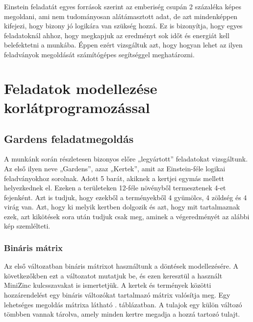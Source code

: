 \documentclass[12pt,a4paper]{report}
\begin{document}
    Einstein feladatát egyes források szerint az emberiség csupán 2 százaléka képes megoldani, ami nem tudományosan alátámasztott adat, de azt mindenképpen kifejezi, hogy bizony jó logikára van szükség hozzá.
    Ez is bizonyítja, hogy egyes feladatoknál ahhoz, hogy megkapjuk az eredményt sok időt és energiát kell belefektetni a munkába.
    Éppen ezért vizsgáltuk azt, hogy hogyan lehet az ilyen feladványok megoldását számítógépes segítséggel meghatározni.


\chapter{Feladatok modellezése korlátprogramozással}

\section{Gardens feladatmegoldás} 

    A munkánk során részletesen bizonyos előre „legyártott” feladatokat vizsgáltunk.
    Az első ilyen neve „Gardens”, azaz „Kertek”, amit az Einstein-féle logikai feladványokhoz sorolnak\cite{gardens}.
    Adott 5 barát, akiknek a kertjei egymás mellett helyezkednek el.
    Ezeken a területeken 12-féle növényből termesztenek 4-et fejenként.
    Azt is tudjuk, hogy ezekből a terményekből 4 gyümölcs, 4 zöldség és 4 virág van.
    Azt, hogy ki melyik kertben dolgozik és azt, hogy mit tartalmaznak ezek, azt kikötések sora után tudjuk csak meg, aminek a végeredményét az alábbi kép szemlélteti.


\subsection{Bináris mátrix}

    Az első változatban bináris mátrixot használtunk a döntések modellezésére.
    A következőkben ezt a változatot mutatjuk be, és ezen keresztül a használt MiniZinc kulcsszavakat is ismertetjük.
    A kertek és termények közötti hozzárendelést egy bináris változókat tartalmazó mátrix valósítja meg.
    Egy lehetséges megoldás mátrixa látható . táblázatban.
    A tulajok egy külön változó tömbben vannak tárolva, amely minden kertre megadja a hozzá tartozó tulajt.
	
\end{document}
